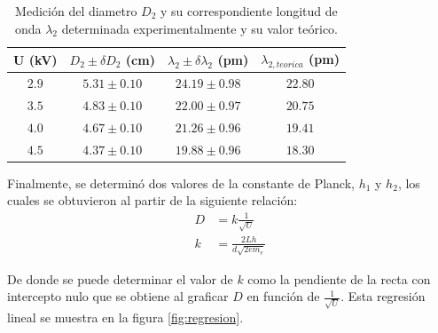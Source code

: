 \documentclass[10pt]{article}
\begin{document}
    \begin{table}[H]
        \centering
        \resizebox{3.3in}{!} {
            \begin{tabular}{cccc}
                \hline
                \multicolumn{1}{l|}{U (kV)} & \multicolumn{1}{l|}{$D_2 \pm \delta D_2$ (cm)}    & \multicolumn{1}{l|}{$\lambda_2 \pm \delta \lambda_2 $ (pm)}   & $\lambda_{2,teorica}$ (pm) \\ \hline
                $2.9$                       & $5.31 \pm 0.10$                                           & $24.19 \pm 0.98$                                                       & $ 22.80 $                      \\
                $3.5$                       & $4.83 \pm 0.10$                                           & $22.00 \pm 0.97$                                                       & $ 20.75 $                      \\
                $4.0$                       & $4.67 \pm 0.10$                                           & $21.26 \pm 0.96$                                                       & $ 19.41 $                      \\
                $4.5$                       & $4.37 \pm 0.10$                                           & $19.88 \pm 0.96$                                                       & $ 18.30 $                      \\ \hline
            \end{tabular}
        }
        \label{tab:datosD2}
        \caption{Medición del diametro $D_2$ y su correspondiente longitud de onda $\lambda_2$ determinada experimentalmente y su valor teórico.}
    \end{table}

    Finalmente, se determinó dos valores de la constante de Planck, $h_1$ y $h_2$, los cuales se obtuvieron al partir de la siguiente relación:
    \begin{equation}
        \begin{split}
            D &= k\frac{1}{\sqrt{U}} \\
            k &= \frac{2Lh}{d\sqrt{2em_e}}
        \end{split}
    \end{equation}

    De donde se puede determinar el valor de $k$ como la pendiente de la recta con intercepto nulo que se obtiene al graficar $D$ en función de $\frac{1}{\sqrt{U}}$. Esta regresión lineal se muestra en la figura \ref{fig:regresion}.
\end{document}
